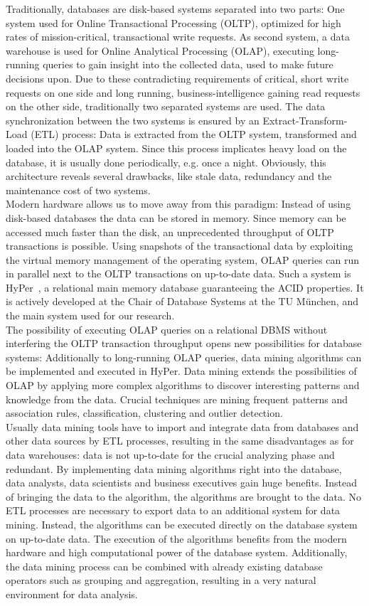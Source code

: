 Traditionally, databases are disk-based systems separated into two parts: One system used for Online Transactional Processing (OLTP), optimized for high rates of mission-critical, transactional write requests. As second system, a data warehouse is used for Online Analytical Processing (OLAP), executing long-running queries to gain insight into the  collected data, used to make future decisions upon. Due to these contradicting requirements of critical, short write requests on one side and long running, business-intelligence gaining read requests on the other side, traditionally two separated systems are used. The data synchronization between the two systems is ensured by an Extract-Transform-Load (ETL) process: Data is extracted from the OLTP system, transformed and loaded into the OLAP system. Since this process implicates heavy load on the database, it is usually done periodically, e.g. once a night. Obviously, this architecture reveals several drawbacks, like stale data, redundancy and the maintenance cost of two systems.
\\
Modern hardware allows us to move away from this paradigm: Instead of using disk-based databases the data can be stored in memory. Since memory can be accessed much faster than the disk, an unprecedented throughput of OLTP transactions is possible. Using snapshots of the transactional data by exploiting the virtual memory management of the operating system, OLAP queries can run in parallel next to the OLTP transactions on up-to-date data. Such a system is HyPer~\parencite{5767867}, a relational main memory database guaranteeing the ACID properties. It is actively developed at the Chair of Database Systems at the TU München, and the main system used for our research. 
\\
The possibility of executing OLAP queries on a relational DBMS without interfering the OLTP transaction throughput opens new possibilities for database systems: Additionally to long-running OLAP queries, data mining algorithms can be implemented and executed in HyPer. Data mining extends the possibilities of OLAP by applying more complex algorithms to discover interesting patterns and knowledge from the data. Crucial techniques are mining frequent patterns and association rules, classification, clustering and outlier detection.
\\
Usually data mining tools have to import and integrate data from databases and other data sources by ETL processes, resulting in the same disadvantages as for data warehouses: data is not up-to-date for the crucial analyzing phase and redundant. 
By implementing data mining algorithms right into the database, data analysts, data scientists and business executives gain huge benefits. Instead of bringing the data to the algorithm, the algorithms are brought to the data. No ETL processes are necessary to export data to an additional system for data mining. Instead, the algorithms can be executed directly on the database system on up-to-date data. The execution of the algorithms benefits from the modern hardware and high computational power of the database system. Additionally, the data mining process can be combined with already existing database operators such as grouping and aggregation, resulting in a very natural environment for data analysis.


